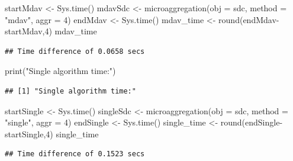 \documentclass[
]{article}
\newenvironment{Shaded}{\begin{snugshade}}{\end{snugshade}}
\newcommand{\AttributeTok}[1]{\textcolor[rgb]{0.77,0.63,0.00}{#1}}
\newcommand{\DecValTok}[1]{\textcolor[rgb]{0.00,0.00,0.81}{#1}}
\newcommand{\FunctionTok}[1]{\textcolor[rgb]{0.00,0.00,0.00}{#1}}
\newcommand{\NormalTok}[1]{#1}
\newcommand{\OtherTok}[1]{\textcolor[rgb]{0.56,0.35,0.01}{#1}}
\newcommand{\SpecialCharTok}[1]{\textcolor[rgb]{0.00,0.00,0.00}{#1}}
\newcommand{\StringTok}[1]{\textcolor[rgb]{0.31,0.60,0.02}{#1}}
\begin{document}
\begin{Shaded}
\begin{Highlighting}[]
\NormalTok{startMdav }\OtherTok{\textless{}{-}} \FunctionTok{Sys.time}\NormalTok{()}
\NormalTok{mdavSdc }\OtherTok{\textless{}{-}} \FunctionTok{microaggregation}\NormalTok{(}\AttributeTok{obj =}\NormalTok{ sdc, }\AttributeTok{method =} \StringTok{"mdav"}\NormalTok{, }\AttributeTok{aggr  =} \DecValTok{4}\NormalTok{)}
\NormalTok{endMdav }\OtherTok{\textless{}{-}} \FunctionTok{Sys.time}\NormalTok{()}
\NormalTok{mdav\_time }\OtherTok{\textless{}{-}} \FunctionTok{round}\NormalTok{(endMdav}\SpecialCharTok{{-}}\NormalTok{startMdav,}\DecValTok{4}\NormalTok{)}
\NormalTok{mdav\_time}
\end{Highlighting}
\end{Shaded}

\begin{verbatim}
## Time difference of 0.0658 secs
\end{verbatim}

\begin{Shaded}
\begin{Highlighting}[]
\FunctionTok{print}\NormalTok{(}\StringTok{"Single algorithm time:"}\NormalTok{)}
\end{Highlighting}
\end{Shaded}

\begin{verbatim}
## [1] "Single algorithm time:"
\end{verbatim}

\begin{Shaded}
\begin{Highlighting}[]
\NormalTok{startSingle }\OtherTok{\textless{}{-}} \FunctionTok{Sys.time}\NormalTok{()}
\NormalTok{singleSdc }\OtherTok{\textless{}{-}} \FunctionTok{microaggregation}\NormalTok{(}\AttributeTok{obj =}\NormalTok{ sdc, }\AttributeTok{method =} \StringTok{"single"}\NormalTok{, }\AttributeTok{aggr =} \DecValTok{4}\NormalTok{)}
\NormalTok{endSingle }\OtherTok{\textless{}{-}} \FunctionTok{Sys.time}\NormalTok{()}
\NormalTok{single\_time }\OtherTok{\textless{}{-}} \FunctionTok{round}\NormalTok{(endSingle}\SpecialCharTok{{-}}\NormalTok{startSingle,}\DecValTok{4}\NormalTok{)}
\NormalTok{single\_time}
\end{Highlighting}
\end{Shaded}

\begin{verbatim}
## Time difference of 0.1523 secs
\end{verbatim}
\end{document}
